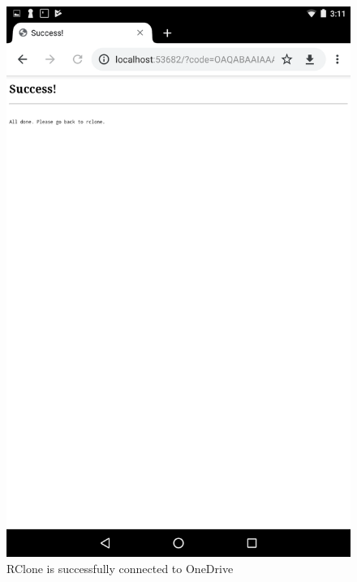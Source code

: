 \begin{figure}[htb]
  \centering
  \includegraphics[scale=0.2]{images/onedrive3.png}
  \caption{RClone is successfully connected to OneDrive}
  \label{fig:onedrive3}
\end{figure}

